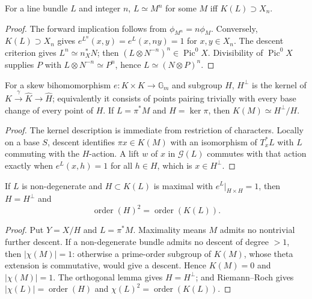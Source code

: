 \begin{theorem}
\label{mumford-thm-line-bundle-power-criterion}
For a line bundle $L$ and integer $n$, $L\simeq M^n$ for some $M$ iff
$K(L)\supset X_n$.
\end{theorem}
\begin{proof}
The forward implication follows from $\phi_{M^n}=n\phi_M$. Conversely,
$K(L)\supset X_n$ gives
$e^{L^n}(x,y)=e^L(x,ny)=1$ for $x,y\in X_n$. The descent criterion gives
$L^n\simeq n_X^*N$; then $(L\otimes N^{-n})^n\in\operatorname{Pic}^0X$.
Divisibility of $\operatorname{Pic}^0X$ supplies $P$ with
$L\otimes N^{-n}\simeq P^n$, hence $L\simeq(N\otimes P)^n$.
\end{proof}

\begin{lemma}
\label{mumford-lem-theta-orthogonal-subgroup}
For a skew bihomomorphism $e:K\times K\to\mathbb G_m$ and subgroup $H$,
$H^\perp$ is the kernel of $K\xrightarrow\gamma\widehat K\to\widehat H$;
equivalently it consists of points pairing trivially with every base change of
every point of $H$. If $L=\pi^*M$ and $H=\ker\pi$, then
$K(M)\simeq H^\perp/H$.
\end{lemma}
\begin{proof}
The kernel description is immediate from restriction of characters. Locally
on a base $S$, descent identifies $\pi x\in K(M)$ with an isomorphism of
$T_x^*L$ with $L$ commuting with the $H$-action. A lift $w$ of $x$ in
$\mathcal G(L)$ commutes with that action exactly when
$e^L(x,h)=1$ for all $h\in H$, which is $x\in H^\perp$.
\end{proof}

\begin{theorem}
\label{mumford-thm-maximal-isotropic-theta}
If $L$ is non-degenerate and $H\subset K(L)$ is maximal with
$e^L|_{H\times H}=1$, then $H=H^\perp$ and
\[
\operatorname{order}(H)^2=\operatorname{order}(K(L)).
\]
\end{theorem}
\begin{proof}
Put $Y=X/H$ and $L=\pi^*M$. Maximality means $M$ admits no nontrivial
further descent. If a non-degenerate bundle admits no descent of degree
$>1$, then $|\chi(M)|=1$: otherwise a prime-order subgroup of $K(M)$,
whose theta extension is commutative, would give a descent. Hence
$K(M)=0$ and $|\chi(M)|=1$. The orthogonal lemma gives $H=H^\perp$; and
Riemann--Roch gives
$|\chi(L)|=\operatorname{order}(H)$ and
$\chi(L)^2=\operatorname{order}(K(L))$.
\end{proof}

